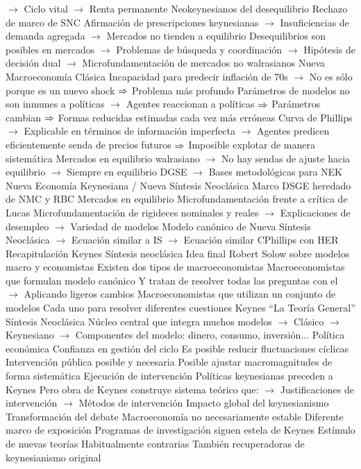 \documentclass{nuevotema}
\begin{document}
\begin{esquemal}
				\4[] $\to$ Ciclo vital
				\4[] $\to$ Renta permanente
				\4 Neokeynesianos del desequilibrio
				\4[] Rechazo de marco de SNC
				\4[] Afirmación de prescripciones keynesianas
				\4[] $\to$ Insuficiencias de demanda agregada
				\4[] $\to$ Mercados no tienden a equilibrio
				\4[] Desequilibrios son posibles en mercados
				\4[] $\to$ Problemas de búsqueda y coordinación
				\4[] $\to$ Hipótesis de decisión dual
				\4[] $\to$ Microfundamentación de mercados no walrasianos
				\4 Nueva Macroeconomía Clásica
				\4[] Incapacidad para predecir inflación de 70s
				\4[] $\to$ No es sólo porque es un nuevo shock
				\4[] $\Rightarrow$ Problema más profundo
				\4[] Parámetros de modelos no son inmunes a políticas
				\4[] $\to$ Agentes reaccionan a políticas
				\4[] $\Rightarrow$ Parámetros cambian
				\4[] $\Rightarrow$ Formas reducidas estimadas cada vez más erróneas
				\4[] Curva de Phillips
				\4[] $\to$ Explicable en términos de información imperfecta
				\4[] $\to$ Agentes predicen eficientemente senda de precios futuros
				\4[] $\Rightarrow$ Imposible explotar de manera sistemática
				\4[] Mercados en equilibrio walrasiano
				\4[] $\to$ No hay sendas de ajuste hacia equilibrio
				\4[] $\to$ Siempre en equilibrio
				\4[] DGSE
				\4[] $\to$ Bases metodológicas para NEK
				\4 Nueva Economía Keynesiana / Nueva Síntesis Neoclásica
				\4[] Marco DSGE heredado de NMC y RBC
				\4[] Mercados en equilibrio
				\4[] Microfundamentación frente a crítica de Lucas
				\4[] Microfundamentación de rigideces nominales y reales
				\4[] $\to$ Explicaciones de desempleo
				\4[] $\to$ Variedad de modelos
				\4[] Modelo canónico de Nueva Síntesis Neoclásica
				\4[] $\to$ Ecuación similar a IS
				\4[] $\to$ Ecuación similar CPhillips con HER
	\1[] 
		\2 Recapitulación
			\3 Keynes
			\3 Síntesis neoclásica
		\2 Idea final
			\3 Robert Solow sobre modelos macro y economistas
				\4 Existen dos tipos de macroeconomistas
				\4 Macroeconomistas que formulan modelo canónico
				\4[] Y tratan de resolver todas las preguntas con el
				\4[] $\to$ Aplicando ligeros cambios
				\4 Macroeconomistas que utilizan un conjunto de modelos
				\4[] Cada uno para resolver diferentes cuestiones
				\4 Keynes
				\4[] ``La Teoría General''
				\4 Síntesis Neoclásica
				\4[] Núcleo central que integra muchos modelos
				\4[] $\to$ Clásico
				\4[] $\to$ Keynesiano
				\4[] $\to$ Componentes del modelo: dinero, consumo, inversión...
			\3 Política económica
			\3 Confianza en gestión del ciclo
				\4[]  Es posible reducir fluctuaciones cíclicas
				\4[]  Intervención pública posible y necesaria
				\4[]  Posible ajustar macromagnitudes de forma sistemática
				\4 Ejecución de intervención
				\4[] Políticas keynesianas preceden a Keynes
				\4[] Pero obra de Keynes construye sistema teórico que:
				\4[] $\to$ Justificaciones de intervención
				\4[] $\to$ Métodos de intervención
			\3 Impacto global del keynesianismo
				\4 Transformación del debate
				\4[]  Macroeconomía no necesariamente estable
				\4[]  Diferente marco de exposición
				\4[]  Programas de investigación siguen estela de Keynes
				\4 Estímulo de nuevas teorías
				\4[]  Habitualmente contrarias
				\4[]  También recuperadoras de keynesianismo original
\end{esquemal}
\end{document}
